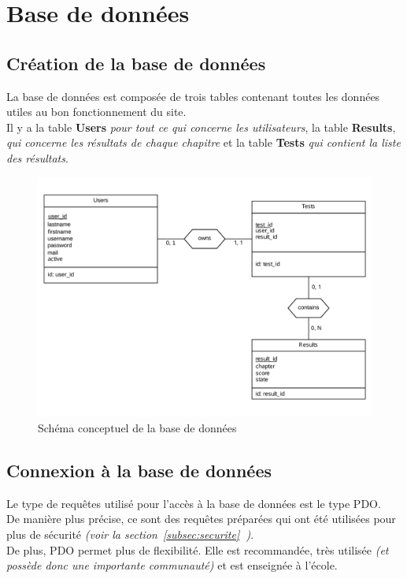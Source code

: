 \section{Base de données}
\label{sec:BD}


\subsection{Création de la base de données}
\label{subsec:creation-db}

La base de données est composée de trois tables contenant toutes les données utiles au bon fonctionnement du site.\\
Il y a la table \textbf{Users} \textit{pour tout ce qui concerne les utilisateurs}, la table \textbf{Results}, \textit{qui concerne les résultats de chaque chapitre} et la table \textbf{Tests} \textit{qui contient la liste des résultats}.

\begin{figure}[h]
  \centering
  \includegraphics[scale=0.4]
  {textures/images/DB/DB.pdf}
  \caption{Schéma conceptuel de la base de données}
  \label{fig:db}
\end{figure}

\newpage


\subsection{Connexion à la base de données}
\label{subsec:conn-bd}

Le type de requêtes utilisé pour l'accès à la base de données est le type PDO.\\
De manière plus précise, ce sont des requêtes préparées qui ont été utilisées pour plus de sécurité \textit{(voir la section~\ref{subsec:securite}\textbf{~})}.\\
De plus, PDO permet plus de flexibilité. Elle est recommandée, très utilisée \textit{(et possède donc une importante communauté)} et est enseignée à l'école.\\

